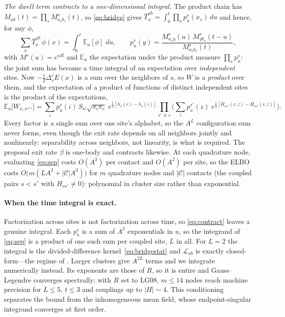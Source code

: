 \documentclass{article}
\newcommand{\E}{\mathbb{E}}
\begin{document}
\emph{The dwell term contracts to a one-dimensional integral.} The product chain has
$M_{ab}(t)=\prod_sM^s_{a_sb_s}(t)$, so \eqref{eq:bridge} gives
$\bar T^{ab}_x=\int_0^t\prod_sp^s_u(x_s)\,du$ and hence, for any $\phi$,
\begin{equation}\label{eq:contract}
 \sum_x\bar T^{ab}_x\,\phi(x)=\int_0^t\!\E_u[\phi]\;du,
 \qquad
 p^s_u(y)=\frac{M^s_{a_sy}(u)\,M^s_{yb_s}(t-u)}{M^s_{a_sb_s}(t)},
\end{equation}
with $M^s(u)=e^{uR}$ and $\E_u$ the expectation under the product measure
$\prod_sp^s_u$: the joint sum has become a time integral of an expectation over
\emph{independent} sites. Now $-\tfrac12\Delta^c_sE(x)$ is a sum over the neighbors of
$s$, so $W$ is a \emph{product} over them, and the expectation of a product of functions
of distinct independent sites is the product of the expectations,
\begin{equation}\label{eq:sep}
 \E_u\big[W_{x,x^{s:c}}\big]=\sum_i p^s_u(i)\,S_{ic}\sqrt{\pi_i\pi_c}\;
   e^{\frac12[h_s(c)-h_s(i)]}
   \prod_{s'\ne s}\Big(\sum_z p^{s'}_u(z)\;e^{\frac12[H_{ss'}(c,z)-H_{ss'}(i,z)]}\Big).
\end{equation}
Every factor is a single sum over one site's alphabet, so the $A^L$ configuration sum
never forms, even though the exit rate depends on all neighbors jointly and nonlinearly:
separability across neighbors, not linearity, is what is required. The proposal exit rate
$\beta$ is one-body and contracts likewise.
At each quadrature node, evaluating \eqref{eq:sep} costs $O(A^3)$ per contact and $O(A^2)$
per site, so the ELBO costs $O\!\big(m(LA^2+|\mathcal C|A^3)\big)$ for $m$ quadrature nodes
and $|\mathcal C|$ contacts (the coupled pairs $s<s'$ with $H_{ss'}\ne0$): polynomial in
cluster size rather than exponential.

\paragraph{When the time integral is exact.} Factorization across sites is not
factorization across time, so \eqref{eq:contract} leaves a genuine integral. Each
$p^s_u$ is a sum of $A^2$ exponentials in $u$, so the integrand of \eqref{eq:sep} is a
product of one such sum per coupled site, $L$ in all. For $L=2$ the integral is the
divided-difference kernel~\eqref{eq:bridgestat} and $\mathcal L_{ab}$ is
exactly closed-form---the regime of . Larger clusters give $A^{2L}$
terms and we integrate numerically instead. Its exponents are those of $R$, so it is
entire and Gauss--Legendre converges spectrally: with $R$ set to LG08, $m\le14$ nodes reach
machine precision for $L\le5$, $t\le3$ and couplings up to $|H|\sim4$. This conditioning separates
the bound from the inhomogeneous mean field, whose endpoint-singular integrand converges
at first order.
\end{document}
